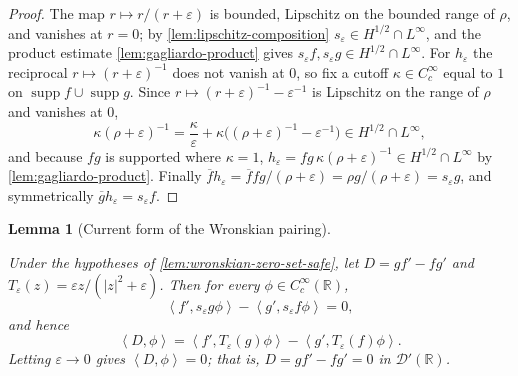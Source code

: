 \documentclass[11pt,oneside]{book}
\providecommand{\uses}[1]{}
\newtheorem{lemma}[theorem]{Lemma}
\theoremstyle{definition}
\theoremstyle{remark}
\newcommand{\R}{\mathbb R}
\newcommand{\D}{\mathcal D}
\newcommand{\supp}{\operatorname{supp}}
\newcommand{\1}{\mathbf 1}
\newcommand{\pair}[2]{\left\langle #1,#2\right\rangle}
\newcommand{\eps}{\varepsilon}
\begin{document}
\begin{proof}
\uses{lem:lipschitz-composition, lem:gagliardo-product}
The map $r\mapsto r/(r+\eps)$ is bounded, Lipschitz on the bounded range of
$\rho$, and vanishes at $r=0$; by \cref{lem:lipschitz-composition}
$s_\eps\in H^{1/2}\cap L^\infty$, and the product estimate
\cref{lem:gagliardo-product} gives $s_\eps f,s_\eps g\in H^{1/2}\cap
L^\infty$. For $h_\eps$ the reciprocal $r\mapsto(r+\eps)^{-1}$ does not
vanish at $0$, so fix a cutoff $\kappa\in C_c^\infty$ equal to $1$ on
$\supp f\cup\supp g$. Since $r\mapsto(r+\eps)^{-1}-\eps^{-1}$ is Lipschitz
on the range of $\rho$ and vanishes at $0$,
\[
 \kappa(\rho+\eps)^{-1}
 =\frac{\kappa}{\eps}+\kappa\bigl((\rho+\eps)^{-1}-\eps^{-1}\bigr)
 \in H^{1/2}\cap L^\infty ,
\]
and because $fg$ is supported where $\kappa=1$,
$h_\eps=fg\,\kappa(\rho+\eps)^{-1}\in H^{1/2}\cap L^\infty$ by
\cref{lem:gagliardo-product}. Finally
$\overline f h_\eps=\overline f fg/(\rho+\eps)=\rho g/(\rho+\eps)=s_\eps g$,
and symmetrically $\overline g h_\eps=s_\eps f$.
\end{proof}

\begin{lemma}[Current form of the Wronskian pairing]\label{lem:wronskian-current-form}
\uses{def:quadratic-form-current, def:Teps-regularizer}
Under the hypotheses of \cref{lem:wronskian-zero-set-safe}, let
$D=gf'-fg'$ and $T_\eps(z)=\eps z/(|z|^2+\eps)$. Then for every
$\phi\in C_c^\infty(\R)$,
\begin{equation}
 \pair{f'}{s_\eps g\phi}-\pair{g'}{s_\eps f\phi}=0,
\end{equation}
and hence
\begin{equation}
 \pair{D}{\phi}
 =\pair{f'}{T_\eps(g)\phi}-\pair{g'}{T_\eps(f)\phi}. \label{eq:m10-W-Teps}
\end{equation}
Letting $\eps\to0$ gives $\pair{D}{\phi}=0$; that is, $D=gf'-fg'=0$ in
$\D'(\R)$.
\end{lemma}
\end{document}
